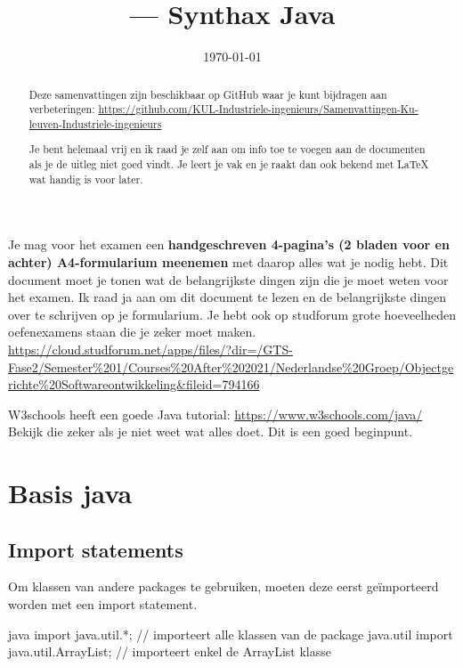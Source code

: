 \documentclass[a4paper,11pt]{article}
\title{\vaknaam{} --- Synthax Java}
\author{\auteur}
\date{\today}
\begin{document}
\maketitle

 
\begin{abstract}
Deze samenvattingen zijn beschikbaar op GitHub waar je kunt bijdragen aan verbeteringen: \url{https://github.com/KUL-Industriele-ingenieurs/Samenvattingen-Ku-leuven-Industriele-ingenieurs}

Je bent helemaal vrij en ik raad je zelf aan om info toe te voegen aan de documenten als je de uitleg niet goed vindt.
Je leert je vak en je raakt dan ook bekend met LaTeX wat handig is voor later.
\end{abstract}

\vspace{1cm}


Je mag voor het examen een \textbf{handgeschreven 
4-pagina's (2 bladen voor en achter) A4-formularium meenemen} met daarop alles wat je nodig hebt.
Dit document moet je tonen wat de belangrijkste dingen zijn die je moet weten voor het examen.
Ik raad ja aan om dit document te lezen en de belangrijkste dingen over te schrijven op je formularium.
Je hebt ook op studforum grote hoeveelheden oefenexamens staan die je zeker moet maken. 
\url{https://cloud.studforum.net/apps/files/?dir=/GTS-Fase2/Semester%201/Courses%20After%202021/Nederlandse%20Groep/Objectgerichte%20Softwareontwikkeling&fileid=794166}
\newline 

W3schools heeft een goede Java tutorial: \url{https://www.w3schools.com/java/}
Bekijk die zeker als je niet weet wat alles doet. Dit is een goed beginpunt.


\section{Basis java}
\subsection{Import statements}
Om klassen van andere packages te gebruiken, 
moeten deze eerst geïmporteerd worden met een import statement.\\

\begin{codeblock}{java}
    import java.util.*; // importeert alle klassen van de package java.util
    import java.util.ArrayList; // importeert enkel de ArrayList klasse
\end{codeblock}
\end{document}
